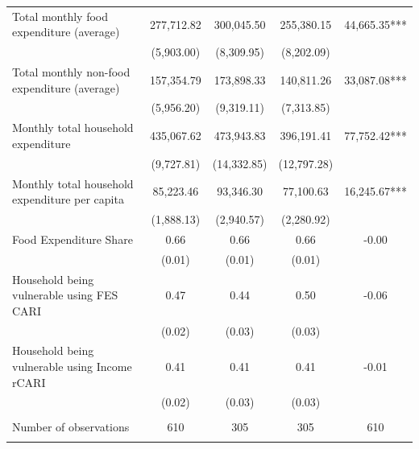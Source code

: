 \begin{tabular}{@{\extracolsep{5pt}}lcccc}
Total monthly food expenditure (average)   & 277,712.82    & 300,045.50    & 255,380.15    & 44,665.35***   \\
 & (5,903.00)  & (8,309.95)  & (8,202.09)  &  \\ [1ex]
Total monthly non-food expenditure (average)   & 157,354.79    & 173,898.33    & 140,811.26    & 33,087.08***   \\
 & (5,956.20)  & (9,319.11)  & (7,313.85)  &  \\ [1ex]
Monthly total household expenditure   & 435,067.62    & 473,943.83    & 396,191.41    & 77,752.42***   \\
 & (9,727.81)  & (14,332.85)  & (12,797.28)  &  \\ [1ex]
Monthly total household expenditure per capita   & 85,223.46    & 93,346.30    & 77,100.63    & 16,245.67***   \\
 & (1,888.13)  & (2,940.57)  & (2,280.92)  &  \\ [1ex]
Food Expenditure Share   & 0.66    & 0.66    & 0.66    & -0.00   \\
 & (0.01)  & (0.01)  & (0.01)  &  \\ [1ex]
Household being vulnerable using FES CARI   & 0.47    & 0.44    & 0.50    & -0.06   \\
 & (0.02)  & (0.03)  & (0.03)  &  \\ [1ex]
Household being vulnerable using Income rCARI   & 0.41    & 0.41    & 0.41    & -0.01   \\
 & (0.02)  & (0.03)  & (0.03)  &  \\ [1ex]
\hline \\[-1.8ex]
Number of observations  & 610   & 305   & 305  & 610  \\
\hline \hline \\[-1.8ex]

\end{tabular}
